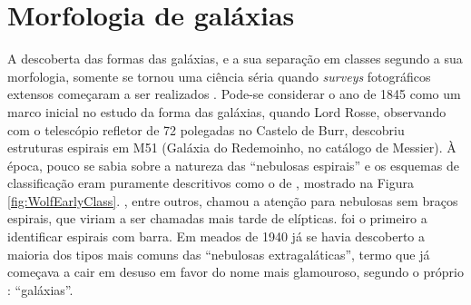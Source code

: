 


\chapter{Morfologia de galáxias}
\label{sec:morph}

A descoberta das formas das galáxias, e a sua separação em classes segundo a sua
morfologia, somente se tornou uma ciência séria quando {\em surveys}
fotográficos extensos começaram a ser realizados \citep{Sandage1975}. Pode-se
considerar o ano de 1845 como um marco inicial no estudo da forma das galáxias,
quando Lord Rosse, observando com o telescópio refletor de 72 polegadas no
Castelo de Burr, descobriu estruturas espirais em M51 (Galáxia do Redemoinho, no
catálogo de Messier). À época, pouco se sabia sobre a natureza das ``nebulosas
espirais'' e os esquemas de classificação eram puramente descritivos como o de
\citet{Wolf1908}, mostrado na Figura \ref{fig:WolfEarlyClass}.
\citet{Knox-Shaw1915}, entre outros, chamou a atenção para nebulosas sem braços
espirais, que viriam a ser chamadas mais tarde de elípticas.
\citet{Curtis1918} foi o primeiro a identificar espirais com barra.
Em meados de 1940 já se havia descoberto a maioria dos tipos mais comuns das
``nebulosas extragaláticas'', termo que já começava a cair em desuso em favor do
nome mais glamouroso, segundo o próprio \citet{hubble1936}: ``galáxias''.

